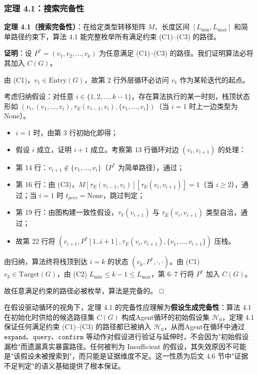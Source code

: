 \documentclass[a4paper,12pt]{ctexart}
\begin{document}
\subsubsection{定理 4.1：搜索完备性}

\textbf{定理 4.1（搜索完备性）}：在给定类型转移矩阵 $M$、长度区间 $[L_{\min}, L_{\max}]$ 和简单路径约束下，算法 4.1 能完整枚举所有满足约束 (C1)–(C3) 的路径。

\textbf{证明}：设 $P^* = (v_1, v_2, \dots, v_k)$ 为任意满足 (C1)–(C3) 的路径。我们证明算法必将其加入 $C(G)$。

由 (C1)，$v_1 \in \text{Entry}(G)$，故第 2 行外层循环必访问 $v_1$ 作为某轮迭代的起点。

考虑归纳假设：对任意 $i \in \{1, 2, \dots, k-1\}$，存在算法执行的某一时刻，栈顶状态形如 $(v_i, (v_1, \dots, v_i), \tau_E(v_{i-1}, v_i), \{v_1, \dots, v_i\})$（当 $i=1$ 时上一边类型为 None）。

\begin{itemize}[leftmargin=*]
\item $i=1$ 时，由第 3 行初始化即得；
\item 假设 $i$ 成立，证明 $i+1$ 成立。考察第 13 行循环对边 $(v_i, v_{i+1})$ 的处理：
\item 第 14 行：$v_{i+1} \notin \{v_1, \dots, v_i\}$（$P^*$ 为简单路径），通过；
\item 第 16 行：由 (C3)，$M[\tau_E(v_{i-1},v_i)][\tau_E(v_i,v_{i+1})]=1$（当 $i\geq 2$），通过；当 $i=1$ 时 $t_{prev}=$None，跳过判定；
\item 第 19 行：由图构建一致性假设，$\tau_V(v_{i+1})$ 与 $\tau_E(v_i, v_{i+1})$ 类型自洽，通过；
\item 故第 22 行将 $(v_{i+1}, P^*[1..i+1], \tau_E(v_i,v_{i+1}), \{v_1,\dots,v_{i+1}\})$ 压栈。
\end{itemize}

由归纳，算法终将栈顶到达 $i=k$ 的状态 $(v_k, P^*, \cdot, \cdot)$。由 (C1) $v_k \in \text{Target}(G)$，由 (C2) $L_{\min} \leq k-1 \leq L_{\max}$，第 6–7 行将 $P^*$ 加入 $C(G)$。

故任意满足约束的路径必被枚举，算法是完备的。 □

在假设驱动循环的视角下，定理 4.1 的完备性应理解为\textbf{假设生成完备性}：算法 4.1 在初始化时供给的候选路径集 $C(G)$ 构成Agent循环的初始假设集 $\mathcal{H}_0$，定理 4.1 保证任何满足约束 (C1)–(C3) 的路径都已被纳入 $\mathcal{H}_0$，从而Agent在循环中通过 $\texttt{expand}$、$\texttt{query}$、$\texttt{confirm}$ 等动作对假设进行验证与延伸时，不会因为"初始假设漏检"而遗漏真实暴露路径。任何被判为 Insufficient 的假设，其失效原因不可能是"该假设未被搜索到"，而只能是证据维度不足。这一性质为后文 4.6 节中"证据不足判定"的语义基础提供了根本保证。
\end{document}

